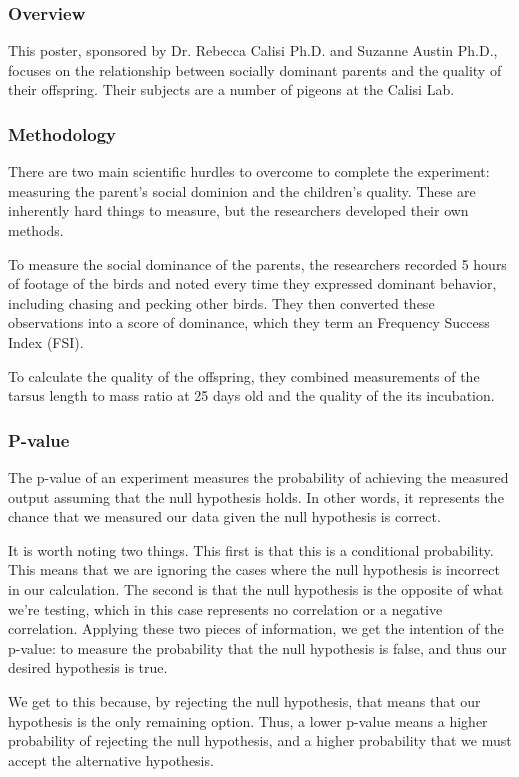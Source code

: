 \documentclass[12pt]{article}
\begin{document}
\subsubsection{Overview}
This poster, sponsored by Dr. Rebecca Calisi Ph.D. and Suzanne Austin Ph.D., focuses on the relationship between socially dominant parents and the quality of their offspring. Their subjects are a number of pigeons at the Calisi Lab.

\subsubsection{Methodology}
There are two main scientific hurdles to overcome to complete the experiment: measuring the parent's social dominion and the children's quality. These are inherently hard things to measure, but the researchers developed their own methods.

To measure the social dominance of the parents, the researchers recorded 5 hours of footage of the birds and noted every time they expressed dominant behavior, including chasing and pecking other birds. They then converted these observations into a score of dominance, which they term an Frequency Success Index (FSI).

To calculate the quality of the offspring, they combined measurements of the tarsus length to mass ratio at 25 days old and the quality of the its incubation.

\subsubsection{P-value} 
The p-value of an experiment measures the probability of achieving the measured output assuming that the null hypothesis holds. In other words, it represents the chance that we measured our data given the null hypothesis is correct. 

It is worth noting two things. This first is that this is a conditional probability. This means that we are ignoring the cases where the null hypothesis is incorrect in our calculation. The second is that the null hypothesis is the opposite of what we're testing, which in this case represents no correlation or a negative correlation. Applying these two pieces of information, we get the intention of the p-value: to measure the probability that the null hypothesis is false, and thus our desired hypothesis is true.

We get to this because, by rejecting the null hypothesis, that means that our hypothesis is the only remaining option. Thus, a lower p-value means a higher probability of rejecting the null hypothesis, and a higher probability that we must accept the alternative hypothesis.
\end{document}

